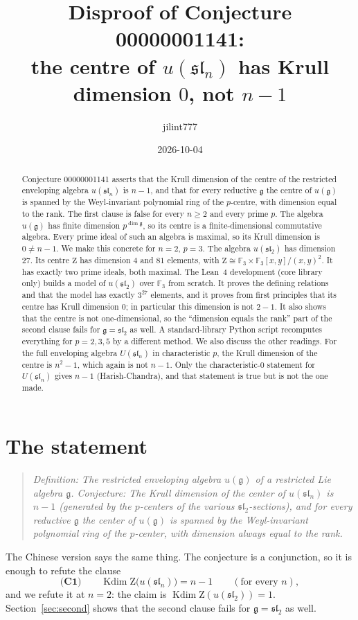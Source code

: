 \documentclass[11pt]{article}
\title{Disproof of Conjecture 00000001141:\\
the centre of $u(\mathfrak{sl}_n)$ has Krull dimension $0$, not $n-1$}
\author{jilint777}
\date{2026-10-04}
\theoremstyle{definition}
\theoremstyle{remark}
\newcommand{\F}{\mathbb{F}}
\newcommand{\Z}{\mathrm{Z}}
\newcommand{\slt}{\mathfrak{sl}_2}
\newcommand{\sln}{\mathfrak{sl}_n}
\newcommand{\g}{\mathfrak{g}}
\newcommand{\kdim}{\operatorname{Kdim}}
\begin{document}
\sloppy
\maketitle

\begin{abstract}
Conjecture 00000001141 asserts that the Krull dimension of the centre of the restricted
enveloping algebra $u(\sln)$ is $n-1$, and that for every reductive $\g$ the centre of $u(\g)$ is
spanned by the Weyl-invariant polynomial ring of the $p$-centre, with dimension equal to the
rank. The first clause is false for every $n\ge 2$ and every prime $p$. The algebra $u(\g)$ has
finite dimension $p^{\dim\g}$, so its centre is a finite-dimensional commutative algebra. Every
prime ideal of such an algebra is maximal, so its Krull dimension is $0\neq n-1$. We make this
concrete for $n=2$, $p=3$. The algebra $u(\slt)$ has dimension $27$. Its centre $\Z$ has
dimension $4$ and $81$ elements, with $\Z\cong\F_3\times\F_3[x,y]/(x,y)^2$. It has exactly two
prime ideals, both maximal. The Lean~4 development (core library only) builds a model of
$u(\slt)$ over $\F_3$ from scratch. It proves the defining relations and that the model has
exactly $3^{27}$ elements, and it proves from first principles that its centre has Krull
dimension $0$; in particular this dimension is not $2-1$. It also shows that the centre is not one-dimensional, so the
``dimension equals the rank'' part of the second clause fails for $\g=\slt$ as well. A
standard-library Python script recomputes everything for $p=2,3,5$ by a different method. We
also discuss the other readings. For the full enveloping algebra $U(\sln)$ in characteristic
$p$, the Krull dimension of the centre is $n^2-1$, which again is not $n-1$. Only the
characteristic-$0$ statement for $U(\sln)$ gives $n-1$ (Harish-Chandra), and that statement is
true but is not the one made.
\end{abstract}

\section{The statement}

\begin{quote}
\emph{Definition: The restricted enveloping algebra $u(\g)$ of a restricted Lie algebra $\g$.
Conjecture: The Krull dimension of the center of $u(\sln)$ is $n-1$ (generated by the $p$-centers
of the various $\slt$-sections), and for every reductive $\g$ the center of $u(\g)$ is spanned by
the Weyl-invariant polynomial ring of the $p$-center, with dimension always equal to the rank.}
\end{quote}
The Chinese version says the same thing. The conjecture is a conjunction, so it is enough to refute the clause
\[
\textbf{(C1)}\qquad \kdim \Z\bigl(u(\sln)\bigr)=n-1 \qquad(\text{for every } n),
\]
and we refute it at $n=2$: the claim is $\kdim\Z(u(\slt))=1$. Section~\ref{sec:second} shows that
the second clause fails for $\g=\slt$ as well.
\end{document}
